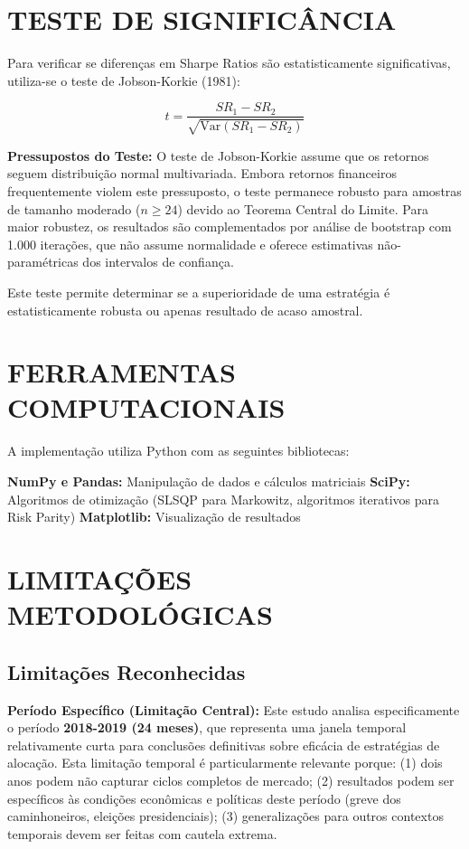 \section{TESTE DE SIGNIFICÂNCIA}

Para verificar se diferenças em Sharpe Ratios são estatisticamente significativas, utiliza-se o teste de Jobson-Korkie (1981):

\begin{equation}
t = \frac{SR_1 - SR_2}{\sqrt{\text{Var}(SR_1 - SR_2)}}
\end{equation}

\textbf{Pressupostos do Teste:} O teste de Jobson-Korkie assume que os retornos seguem distribuição normal multivariada. Embora retornos financeiros frequentemente violem este pressuposto, o teste permanece robusto para amostras de tamanho moderado ($n \geq 24$) devido ao Teorema Central do Limite. Para maior robustez, os resultados são complementados por análise de bootstrap com 1.000 iterações, que não assume normalidade e oferece estimativas não-paramétricas dos intervalos de confiança.

Este teste permite determinar se a superioridade de uma estratégia é estatisticamente robusta ou apenas resultado de acaso amostral.

\section{FERRAMENTAS COMPUTACIONAIS}

A implementação utiliza Python com as seguintes bibliotecas:

\textbf{NumPy e Pandas:} Manipulação de dados e cálculos matriciais
\textbf{SciPy:} Algoritmos de otimização (SLSQP para Markowitz, algoritmos iterativos para Risk Parity)
\textbf{Matplotlib:} Visualização de resultados

\section{LIMITAÇÕES METODOLÓGICAS}

\subsection{Limitações Reconhecidas}

\textbf{Período Específico (Limitação Central):} Este estudo analisa especificamente o período \textbf{2018-2019 (24 meses)}, que representa uma janela temporal relativamente curta para conclusões definitivas sobre eficácia de estratégias de alocação. Esta limitação temporal é particularmente relevante porque: (1) dois anos podem não capturar ciclos completos de mercado; (2) resultados podem ser específicos às condições econômicas e políticas deste período (greve dos caminhoneiros, eleições presidenciais); (3) generalizações para outros contextos temporais devem ser feitas com cautela extrema.

